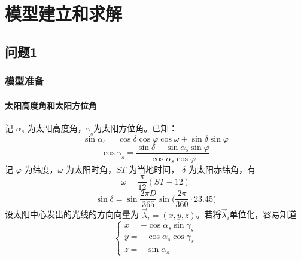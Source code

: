 \documentclass[../main.tex]{subfiles}
\begin{document}
\section{模型建立和求解}
\subsection{问题1}
\subsubsection{模型准备}
\paragraph{太阳高度角和太阳方位角}
记 \(\alpha _{s}\) 为太阳高度角，\(\gamma _{s}\)为太阳方位角。已知：
\begin{equation}
\sin \alpha _{s} = \cos \delta \cos \varphi \cos \omega + \sin \delta \sin \varphi
\end{equation}
\begin{equation}
\cos \gamma _{s} = \frac{\sin \delta -\sin \alpha_{s} \sin \varphi}{\cos \alpha _{s} \cos \varphi}
\end{equation}
记 \( \varphi\) 为纬度，\(\omega\) 为太阳时角，\(ST\) 为当地时间， \(\delta\) 为太阳赤纬角，有
\begin{equation}
\omega = \frac{\pi}{12} ( ST - 12)
\end{equation}
\begin{equation}
\sin \delta = \sin \frac{2 \pi D}{365} \sin \big(\frac{2\pi}{360} \cdot 23.45\big)
\end{equation}
设太阳中心发出的光线的方向向量为 \(\vec\lambda _{i} = (x,  y , z)\)。若将\(\vec \lambda_{i}\)单位化，容易知道
\begin{equation}
\begin{cases}
x = - \cos \alpha_{s} \sin \gamma _{s} \\
y = - \cos \alpha_{s} \cos \gamma_{s} \\
z = - \sin \alpha_{s}
\end{cases}
\end{equation}
\end{document}
